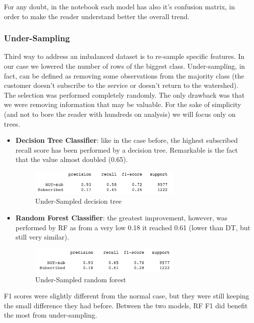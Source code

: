 \noindent For any doubt, in the notebook each model has also it's confusion matrix, in order to make the reader understand better the overall trend.

\clearpage
\subsubsection{Under-Sampling}
Third way to address an imbalanced dataset is to re-sample specific features. In our case we lowered the number of rows of the biggest class. Under-sampling, in fact, can be defined as removing some observations from the majority class (the customer doesn't subscribe to the service or doesn't return to the watershed). 
The selection was performed completely randomly. The only drawback was that we were removing information that may be valuable. For the sake of simplicity (and not to bore the reader with hundreds on analysis) we will focus only on trees.

\begin{itemize}
\item \textbf{Decision Tree Classifier}: like in the case before, the highest subscribed recall score has been performed by a decision tree. Remarkable is the fact that the value almost doubled (0.65). 

\begin{figure}[H]
\centering
\includegraphics[width=0.7\textwidth]{Img/under_tree.png}
\caption{Under-Sampled decision tree}
\end{figure}
\item \textbf{Random Forest Classifier}: the greatest improvement, however, was performed by RF as from a very low 0.18 it reached 0.61 (lower than DT, but still very similar).

\begin{figure}[H]
\centering
\includegraphics[width=0.7\textwidth]{Img/under_forest.png}
\caption{Under-Sampled random forest}
\end{figure}
\end{itemize}

\noindent F1 scores were slightly different from the normal case, but they were still keeping the small difference they had before. Between the two models, RF F1 did benefit the most from under-sampling.

